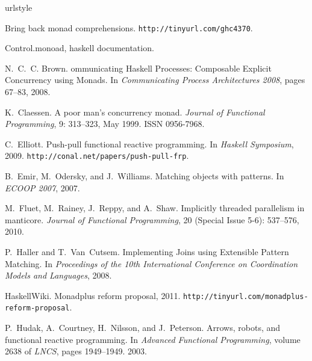 \documentclass[preprint]{sigplanconf}
\begin{document}
\begin{thebibliography}{37}
\raggedright
\providecommand{\natexlab}[1]{#1}
\providecommand{\url}[1]{\texttt{#1}}
\expandafter\ifx\csname urlstyle\endcsname\relax
  \providecommand{\doi}[1]{doi: #1}\else
  \providecommand{\doi}{doi: \begingroup \urlstyle{rm}\Url}\fi

Bring back monad comprehensions.
\url{http://tinyurl.com/ghc4370}.

Control.monoad, haskell documentation.

N.~C.~C. Brown.
ommunicating {H}askell {P}rocesses: {C}omposable {E}xplicit
  {C}oncurrency using {M}onads.
\newblock In \emph{{C}ommunicating {P}rocess {A}rchitectures 2008}, pages
  67--83, 2008.

K.~Claessen.
\newblock A poor man's concurrency monad.
\newblock \emph{Journal of Functional Programming}, 9: 313--323, May
  1999.
\newblock ISSN 0956-7968.

C.~Elliott.
\newblock Push-pull functional reactive programming.
\newblock In \emph{Haskell Symposium}, 2009.
\newblock \url{http://conal.net/papers/push-pull-frp}.

B.~Emir, M.~Odersky, and J.~Williams.
\newblock Matching objects with patterns.
\newblock In \emph{ECOOP 2007}, 2007.

M.~Fluet, M.~Rainey, J.~Reppy, and A.~Shaw.
\newblock Implicitly threaded parallelism in manticore.
\newblock \emph{Journal of Functional Programming}, 20 (Special Issue
  5-6): 537--576, 2010.

P.~Haller and T.~Van~Cutsem.
\newblock Implementing {J}oins using {E}xtensible {P}attern {M}atching.
\newblock In \emph{Proceedings of the 10th {I}nternational {C}onference on
  {C}oordination {M}odels and {L}anguages}, 2008.

HaskellWiki.
\newblock Monadplus reform proposal, 2011.
\newblock \url{http://tinyurl.com/monadplus-reform-proposal}.

P.~Hudak, A.~Courtney, H.~Nilsson, and J.~Peterson.
\newblock Arrows, robots, and functional reactive programming.
\newblock In \emph{Advanced Functional Programming}, volume 2638 of
  \emph{LNCS}, pages 1949--1949. 2003.


\end{thebibliography}
\end{document}
